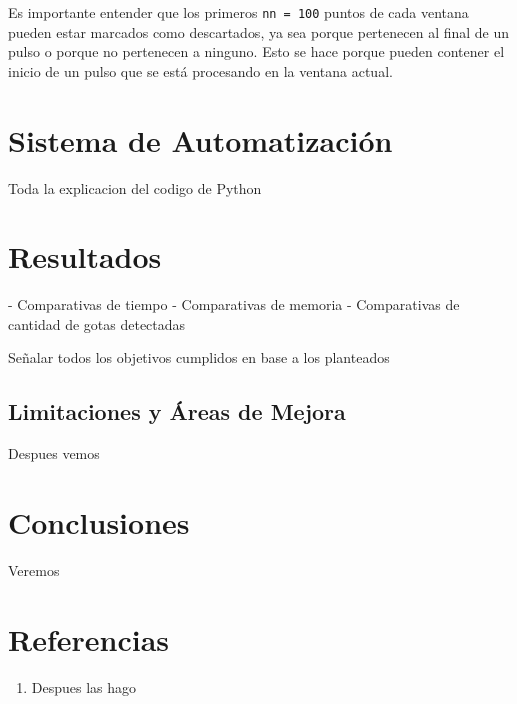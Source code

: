 \documentclass[12pt,a4paper]{article}
\begin{document}
Es importante entender que los primeros \texttt{nn = 100} puntos de cada ventana pueden estar marcados como descartados, ya sea porque pertenecen al final de un pulso o porque no pertenecen a ninguno. Esto se hace porque pueden contener el inicio de un pulso que se está procesando en la ventana actual.


\section{Sistema de Automatización}
\lhead{}

Toda la explicacion del codigo de Python

\section{Resultados}

- Comparativas de tiempo
- Comparativas de memoria
- Comparativas de cantidad de gotas detectadas

Señalar todos los objetivos cumplidos en base a los planteados

\subsection{Limitaciones y Áreas de Mejora}
\lhead{}

Despues vemos

\section{Conclusiones}

Veremos 

\section{Referencias}

\begin{enumerate}
    \item Despues las hago
\end{enumerate}
\end{document}
